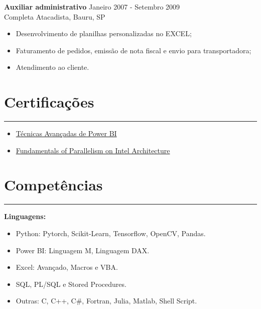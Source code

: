 \documentclass[10pt]{article}
\begin{document}
{\bf Auxiliar administrativo} \hfill  Janeiro 2007 - Setembro 2009\\
Completa Atacadista, Bauru, SP

\begin{itemize} \itemsep -2pt %
    \item Desenvolvimento de planilhas personalizadas no EXCEL;
    \item Faturamento de pedidos, emissão de nota fiscal e envio para transportadora;
    \item Atendimento ao cliente.
\end{itemize}


\section*{Certificações}
\vspace{-15pt}
\rule{\linewidth}{1pt}

\begin{itemize} \itemsep -2pt
    \item \href{https://www.linkedin.com/learning/certificates/f233c38eaee572144d1b8f00a6a1d891dab0712399576d922c470f474a4963a7}{Técnicas Avançadas de Power BI}
    \item \href{https://coursera.org/share/c6d3914afc8a0b3de06c3af0d6ae468c}{Fundamentals of Parallelism on Intel Architecture}
\end{itemize}


\section*{Competências}
\vspace{-15pt}
\rule{\linewidth}{1pt}

{\bf Linguagens:}
\begin{itemize} \itemsep -2pt
    \item Python: Pytorch, Scikit-Learn, Tensorflow, OpenCV, Pandas.
    \item Power BI: Linguagem M, Linguagem DAX.
    \item Excel: Avançado, Macros e VBA.
    \item SQL, PL/SQL e Stored Procedures.
    \item Outras: C, C++, C\#, Fortran, Julia, Matlab, Shell Script.
\end{itemize}
\end{document}

